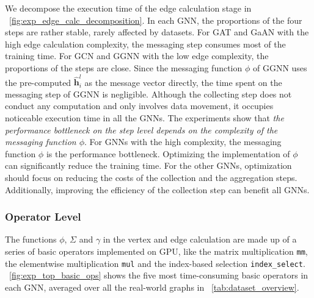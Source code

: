 We decompose the execution time of the edge calculation stage in \figurename~\ref{fig:exp_edge_calc_decomposition}.
In each GNN, the proportions of the four steps are rather stable, rarely affected by datasets. 
For GAT and GaAN with the high edge calculation complexity, the messaging step consumes most of the training time. 
For GCN and GGNN with the low edge complexity, the proportions of the steps are close. 
Since the messaging function $\phi$ of GGNN uses the pre-computed $\hat{\boldsymbol{h}}^l_i$ as the message vector directly, the time spent on the messaging step of GGNN is negligible.
Although the collecting step does not conduct any computation and only involves data movement, it occupies noticeable execution time in all the GNNs.
The experiments show that \emph{the performance bottleneck on the step level depends on the complexity of the messaging function $\phi$}.
For GNNs with the high complexity, the messaging function $\phi$ is the performance bottleneck.
Optimizing the implementation of $\phi$ can significantly reduce the training time.
For the other GNNs, optimization should focus on reducing the costs of the collection and the aggregation steps.
Additionally, improving the efficiency of the collection step can benefit all GNNs.

\subsubsection{Operator Level}

The functions $\phi$, $\Sigma$ and $\gamma$ in the vertex and edge calculation are made up of a series of basic operators implemented on GPU, like the matrix multiplication \texttt{mm}, the elementwise multiplication \texttt{mul} and the index-based selection \texttt{index\_select}.
\figurename~\ref{fig:exp_top_basic_ops} shows the five most time-consuming basic operators in each GNN, averaged over all the real-world graphs in \tablename~\ref{tab:dataset_overview}.

